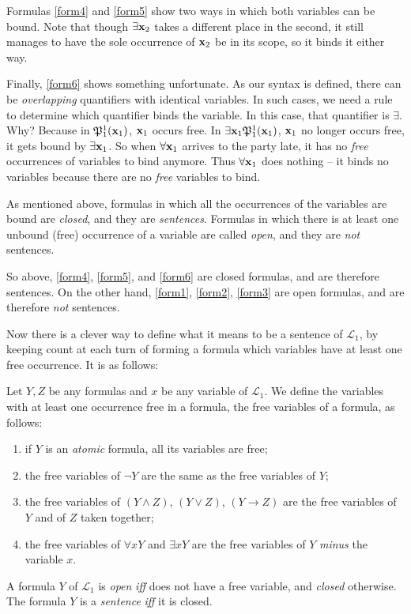 Formulas \ref{form4} and \ref{form5} show two ways in which both variables can be bound. Note that though $\exists \mathbf{x}_{2}$ takes a different place in the second, it still manages to have the sole occurrence of $\mathbf{x}_{2}$ be in its scope, so it binds it either way. 

Finally, \ref{form6} shows something unfortunate. As our syntax is defined, there can be \textit{overlapping} quantifiers with identical variables. In such cases, we need a rule to determine which quantifier binds the variable. In this case, that quantifier is $\exists$. Why? Because in $\mathfrak{P}^{1}_{1}(\mathbf{x}_{1})$, $\mathbf{x}_{1}$ occurs free. In $\exists \mathbf{x}_{1} \mathfrak{P}^{1}_{1}(\mathbf{x}_{1})$, $\mathbf{x}_{1}$ no longer occurs free, it gets bound by $\exists \mathbf{x}_{1}$. So when $\forall \mathbf{x}_{1}$ arrives to the party late, it has no \textit{free} occurrences of variables to bind anymore. Thus $\forall \mathbf{x}_{1}$ does nothing -- it binds no variables because there are no \textit{free} variables to bind. 

As mentioned above, formulas in which all the occurrences of the variables are bound are \textit{closed}, and they are \textit{sentences}. Formulas in which there is at least one unbound (free) occurrence of a variable are called \textit{open}, and they are \textit{not} sentences. 

So above, \ref{form4}, \ref{form5}, and \ref{form6} are closed formulas, and are therefore sentences. On the other hand, \ref{form1}, \ref{form2}, \ref{form3} are open formulas, and are therefore \textit{not} sentences. 

Now there is a clever way to define what it means to be a sentence of $\mathcal{L}_1$, by keeping count at each turn of forming a formula which variables have at least one free occurrence. It is as follows:

\begin{defn}[Sentences]
Let $Y, Z$ be any formulas and $x$ be any variable of $\mathcal{L}_1$. We define the variables with at least one occurrence free in a formula, the free variables of a formula, as follows: 
\begin{enumerate}
	\item if $Y$ is an \textit{atomic} formula, all its variables are free;
	\item the free variables of $\neg Y$ are the same as the free variables of $Y$;
	\item the free variables of $(Y \wedge Z)$, $(Y \vee Z)$, $(Y \rightarrow Z)$ are the free variables of $Y$ and of $Z$ taken together;
	\item the free variables of $\forall x Y$ and $\exists x Y$ are the free variables of $Y$ \textit{minus} the variable $x$.
\end{enumerate}

A formula $Y$ of $\mathcal{L}_1$ is \textit{open} \textit{iff} does not have a free variable, and \textit{closed} otherwise. The formula $Y$ is a \textit{sentence} \textit{iff} it is closed. 
\end{defn}

